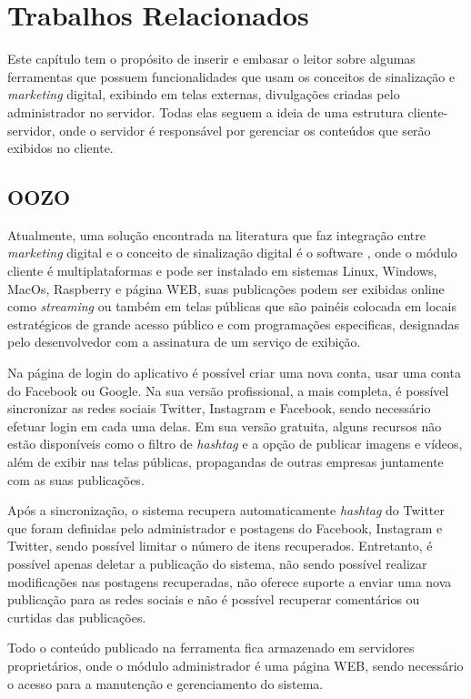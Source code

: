 \chapter[Trabalhos Relacionados]{Trabalhos Relacionados}
Este capítulo tem o propósito de inserir e embasar o leitor sobre algumas ferramentas que possuem funcionalidades que usam os conceitos de sinalização e \textit{marketing} digital, exibindo em telas externas, divulgações criadas pelo administrador no servidor. Todas elas seguem a ideia de uma estrutura cliente-servidor, onde o servidor é responsável por gerenciar os conteúdos que serão exibidos no cliente.


\section{OOZO}
\label{sec:oozo}
Atualmente, uma solução encontrada na literatura que faz integração entre \textit{marketing} digital e o conceito de sinalização digital é o software \cite{oozo2017}, onde o módulo cliente é multiplataformas e pode ser instalado em sistemas Linux, Windows, MacOs, Raspberry e página WEB, suas publicações podem ser exibidas online como \textit{streaming} ou também em telas públicas que são painéis colocada em locais estratégicos de grande acesso público e com programações especificas, designadas pelo desenvolvedor com a assinatura de um serviço de exibição.

Na página de login do aplicativo é possível criar uma nova conta, usar uma conta do Facebook ou Google. Na sua versão profissional, a mais completa, é possível sincronizar as redes sociais Twitter, Instagram e Facebook, sendo necessário efetuar login em cada uma delas. Em sua versão gratuita, alguns recursos não estão disponíveis como o filtro de \textit{hashtag} e a opção de publicar imagens e vídeos, além de exibir nas telas públicas, propagandas de outras empresas juntamente com as suas publicações. 

Após a sincronização, o sistema recupera automaticamente \textit{hashtag} do Twitter que foram definidas pelo administrador e postagens do Facebook, Instagram e Twitter, sendo possível limitar o número de itens recuperados. Entretanto, é possível apenas deletar a publicação do sistema, não sendo possível realizar modificações nas postagens recuperadas, não oferece suporte a enviar uma nova publicação para as redes sociais e não é possível recuperar comentários ou curtidas das publicações.

Todo o conteúdo publicado na ferramenta fica armazenado em servidores proprietários, onde o módulo administrador é uma página WEB, sendo necessário o acesso para a manutenção e gerenciamento do sistema. 

